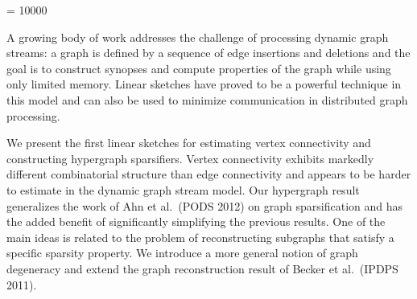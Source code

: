 \let\crnotice\mycrnotice%
\let\confname\myconfname%


\widowpenalty = 10000



\maketitle

\fi

A growing body of work addresses the challenge of processing dynamic graph streams: a graph is defined by a sequence of edge insertions and deletions and the goal is to construct synopses and compute properties of the graph while using only limited memory. 
Linear sketches have proved to be a powerful technique in this model and can also be used  to minimize communication in distributed graph processing. 

We present the first linear sketches for estimating vertex connectivity and constructing hypergraph sparsifiers. 
Vertex connectivity exhibits markedly different combinatorial structure than edge connectivity and appears to be harder to estimate in the dynamic graph stream model. Our hypergraph result generalizes the work of Ahn et al.~(PODS 2012) on graph sparsification and has the added benefit of significantly simplifying the previous results. One of the main ideas is related to the problem of reconstructing subgraphs that satisfy a specific sparsity property. We introduce a more general notion of graph degeneracy and extend the graph reconstruction result of Becker et al.~(IPDPS 2011).

